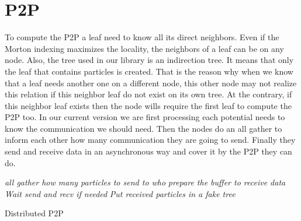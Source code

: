 \documentclass[12pt,letterpaper,titlepage]{report}
\begin{document}
\section{P2P}
To compute the P2P a leaf need to know all its direct neighbors.
Even if the Morton indexing maximizes the locality, the neighbors of a leaf can be on any node.
Also, the tree used in our library is an indirection tree.
It means that only the leaf that contains particles is created.
That is the reason why when we know that a leaf needs another one on a different node, this other node may not realize this relation if this neighbor leaf do not exist on its own tree.
At the contrary, if this neighbor leaf exists then the node wills require the first leaf to compute the P2P too.
In our current version we are first processing each potential needs to know the communication we should need.
Then the nodes do an all gather to inform each other how many communication they are going to send.
Finally they send and receive data in an asynchronous way and cover it by the P2P they can do.
\BlankLine
\begin{algorithm}[H]
\linesnumbered
\SetLine
{}
\BlankLine
{}
\emph{all gather how many particles to send to who}\;
\emph{prepare the buffer to receive data}\;
\emph{Wait send and recv if needed}\;
\emph{Put received particles in a fake tree}\;
\BlankLine
\caption{Distributed P2P}
\end{algorithm}
\end{document}
